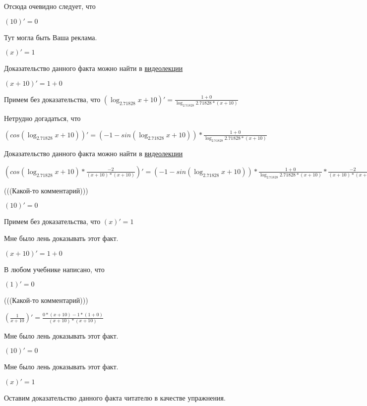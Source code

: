 \documentclass[12pt,a4paper,fleqn]{article}
\theoremstyle{definition}
\begin{document}
Отсюда очевидно следует, что

$( 10 )' =  0 $

Тут могла быть Ваша реклама.

$( x )' =  1 $

Доказательство данного факта можно найти в \href{https://www.youtube.com/watch?v=dQw4w9WgXcQ}{видеолекции}

$( x  +  10 )' =  1  +  0 $

Примем без доказательства, что
$(\log_{ 2.71828 }{ x  +  10 })' = \frac{ 1  +  0 }{\log_{ 2.71828 }{ 2.71828 } * ( x  +  10 )}
$

Нетрудно догадаться, что

$(cos(\log_{ 2.71828 }{ x  +  10 }))' = ( -1  - sin(\log_{ 2.71828 }{ x  +  10 })) * \frac{ 1  +  0 }{\log_{ 2.71828 }{ 2.71828 } * ( x  +  10 )}
$

Доказательство данного факта можно найти в \href{https://www.youtube.com/watch?v=dQw4w9WgXcQ}{видеолекции}

$(cos(\log_{ 2.71828 }{ x  +  10 }) * \frac{ -2 }{( x  +  10 ) * ( x  +  10 )}
)' = ( -1  - sin(\log_{ 2.71828 }{ x  +  10 })) * \frac{ 1  +  0 }{\log_{ 2.71828 }{ 2.71828 } * ( x  +  10 )}
 * \frac{ -2 }{( x  +  10 ) * ( x  +  10 )}
 + cos(\log_{ 2.71828 }{ x  +  10 }) * \frac{ 0  * ( x  +  10 ) * ( x  +  10 ) -  -2  * (( 1  +  0 ) * ( x  +  10 ) + ( x  +  10 ) * ( 1  +  0 ))}{( x  +  10 ) * ( x  +  10 ) * ( x  +  10 ) * ( x  +  10 )}
$

(((Какой-то комментарий)))

$( 10 )' =  0 $

Примем без доказательства, что
$( x )' =  1 $

Мне было лень доказывать этот факт.

$( x  +  10 )' =  1  +  0 $

В любом учебнике написано, что

$( 1 )' =  0 $

(((Какой-то комментарий)))

$(\frac{ 1 }{ x  +  10 }
)' = \frac{ 0  * ( x  +  10 ) -  1  * ( 1  +  0 )}{( x  +  10 ) * ( x  +  10 )}
$

Мне было лень доказывать этот факт.

$( 10 )' =  0 $

Мне было лень доказывать этот факт.

$( x )' =  1 $

Оставим доказательство данного факта читателю в качестве упражнения.
\end{document}
